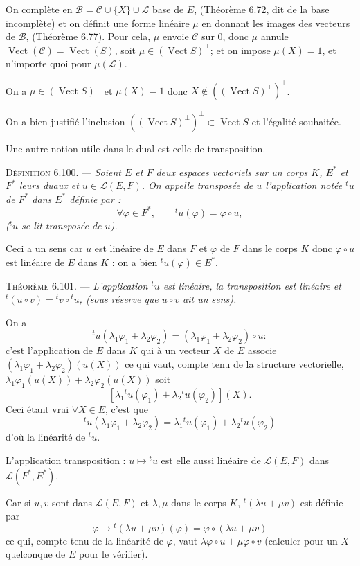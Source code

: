 On complète en $\mathcal B=\mathcal C\cup\{X\}\cup\mathcal L$ base de $E$, (Théorème 6.72, dit de la base incomplète) et on définit une forme linéaire $\mu$ en donnant les images des vecteurs de $\mathcal B$, (Théorème 6.77). Pour cela, $\mu$ envoie $\mathcal C$ sur 0, donc $\mu$ annule $\operatorname{Vect}(\mathcal C)=\operatorname{Vect}(S)$, soit $\mu\in(\operatorname{Vect}S)^\perp$; et on impose $\mu(X)=1$, et n'importe quoi pour $\mu(\mathcal L)$.

On a $\mu\in(\operatorname{Vect}S)^\perp$ et $\mu(X)=1$ donc $X\notin((\operatorname{Vect}S)^\perp)^\perp$.

On a bien justifié l'inclusion $((\operatorname{Vect}S)^\perp)^\perp\subset\operatorname{Vect}S$ et l'égalité souhaitée. \bookend

Une autre notion utile dans le dual est celle de transposition.

\medskip\noindent\textsc{Définition 6.100.} --- \emph{Soient $E$ et $F$ deux espaces vectoriels sur un corps $K$, $E^*$ et $F^*$ leurs duaux et $u\in\mathcal L(E,F)$. On appelle transposée de $u$ l'application notée ${}^tu$ de $F^*$ dans $E^*$ définie par :
\[
\forall\varphi\in F^*,\qquad {}^tu(\varphi)=\varphi\circ u,
\]
(${}^tu$ se lit transposée de $u$).}

Ceci a un sens car $u$ est linéaire de $E$ dans $F$ et $\varphi$ de $F$ dans le corps $K$ donc $\varphi\circ u$ est linéaire de $E$ dans $K$ : on a bien ${}^tu(\varphi)\in E^*$.

\medskip\noindent\textsc{Théorème 6.101.} --- \emph{L'application ${}^tu$ est linéaire, la transposition est linéaire et ${}^t(u\circ v)={}^tv\circ{}^tu$, (sous réserve que $u\circ v$ ait un sens).}

On a
\[
{}^tu(\lambda_1\varphi_1+\lambda_2\varphi_2)=(\lambda_1\varphi_1+\lambda_2\varphi_2)\circ u:
\]
c'est l'application de $E$ dans $K$ qui à un vecteur $X$ de $E$ associe $(\lambda_1\varphi_1+\lambda_2\varphi_2)(u(X))$ ce qui vaut, compte tenu de la structure vectorielle, $\lambda_1\varphi_1(u(X))+\lambda_2\varphi_2(u(X))$ soit
\[
[\lambda_1{}^tu(\varphi_1)+\lambda_2{}^tu(\varphi_2)](X).
\]
Ceci étant vrai $\forall X\in E$, c'est que
\[
{}^tu(\lambda_1\varphi_1+\lambda_2\varphi_2)=\lambda_1{}^tu(\varphi_1)+\lambda_2{}^tu(\varphi_2)
\]
d'où la linéarité de ${}^tu$.

L'application transposition : $u\longmapsto{}^tu$ est elle aussi linéaire de $\mathcal L(E,F)$ dans $\mathcal L(F^*,E^*)$.

Car si $u,v$ sont dans $\mathcal L(E,F)$ et $\lambda,\mu$ dans le corps $K$, ${}^t(\lambda u+\mu v)$ est définie par
\[
\varphi\longmapsto{}^t(\lambda u+\mu v)(\varphi)=\varphi\circ(\lambda u+\mu v)
\]
ce qui, compte tenu de la linéarité de $\varphi$, vaut $\lambda\varphi\circ u+\mu\varphi\circ v$ (calculer pour un $X$ quelconque de $E$ pour le vérifier).

